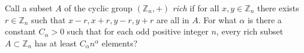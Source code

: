 Call a subset $A$ of the cyclic group $(\mathbb{Z}_n,+)$ \textit{rich} if for all $x,y \in \mathbb{Z}_n$ there exists $r \in \mathbb{Z}_n$ such that $x-r,x+r,y-r,y+r$ are all in $A$. For what $\alpha$ is there a constant $C_\alpha>0$ such that for each odd positive integer $n$, every rich subset $A \subset \mathbb{Z}_n$ has at least $C_\alpha n^\alpha$ elements?